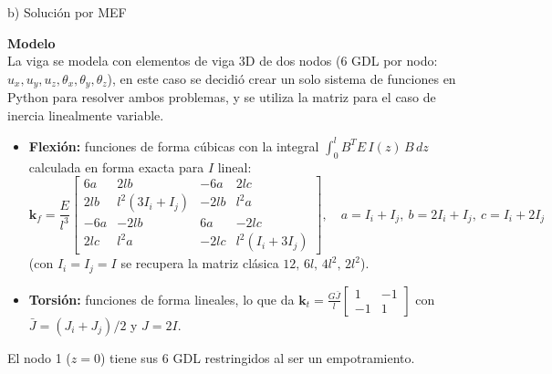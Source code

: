 \begin{desarrollo}{b) Solución por MEF}

\textbf{Modelo}\\
La viga se modela con elementos de viga 3D de dos nodos (6 GDL por nodo:
$u_x,u_y,u_z,\theta_x,\theta_y,\theta_z$), en este caso se decidió crear un solo sistema de funciones en Python para resolver ambos problemas, y se utiliza la matriz para el caso de inercia linealmente variable.
\begin{itemize}[itemsep=2pt]
    \item \textbf{Flexión:} funciones de forma cúbicas con la
    integral $\int_0^{l} B^T E\,I(z)\,B\,dz$ calculada en forma exacta para
    $I$ lineal:
    $$\mathbf{k}_f=\frac{E}{l^3}\begin{bmatrix}
    6a & 2lb & -6a & 2lc\\
    2lb & l^2(3I_i+I_j) & -2lb & l^2a\\
    -6a & -2lb & 6a & -2lc\\
    2lc & l^2a & -2lc & l^2(I_i+3I_j)
    \end{bmatrix},\quad a=I_i+I_j,\ b=2I_i+I_j,\ c=I_i+2I_j$$
    (con $I_i=I_j=I$ se recupera la matriz clásica $12,\,6l,\,4l^2,\,2l^2$).
    \item \textbf{Torsión:} funciones de forma lineales, lo que da
    $\mathbf{k}_t=\frac{G\bar J}{l}\begin{bmatrix}1&-1\\-1&1\end{bmatrix}$ con
    $\bar J=(J_i+J_j)/2$ y $J=2I$.
\end{itemize}
El nodo 1 ($z=0$) tiene sus 6 GDL restringidos al ser un empotramiento.


\end{desarrollo}
